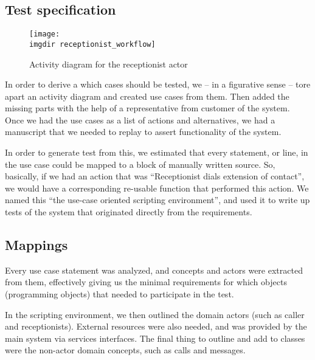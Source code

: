 \subsection{Test specification}
\label{sec:1st-iteration-test-specification}
\begin{figure}[h]
\texttt{[image: \\imgdir receptionist\_workflow]}
\centering
\caption{Activity diagram for the receptionist actor}
\label{fig:activity_diagram_receptionist}
\end{figure}

In order to derive a which cases should be tested, we -- in a figurative sense --  tore apart an activity diagram and created use cases from them. Then added the missing parts with the help of a representative from customer of the system. Once we had the use cases as a list of actions and alternatives, we had a manuscript that we needed to replay to assert functionality of the system.\medskip

\noindent In order to generate test from this, we estimated that every statement, or line, in the use case could be mapped to a block of manually written source. So, basically, if we had an action that was ``Receptionist dials extension of contact'', we would have a corresponding re-usable function that performed this action. We named this ``the use-case oriented scripting environment'', and used it to write up tests of the system that originated directly from the requirements.

\subsection{Mappings}
Every use case statement was analyzed, and concepts and actors were extracted from them, effectively giving us the minimal requirements for which objects (programming objects) that needed to participate in the test.\medskip

\noindent In the scripting environment, we then outlined the domain actors (such as caller and receptionists). External resources were also needed, and was provided by the main system via services interfaces. The final thing to outline and add to classes were the non-actor domain concepts, such as calls and messages.\medskip

